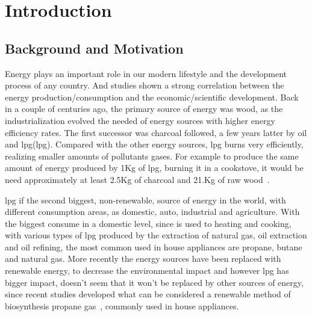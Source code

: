 \cleardoublepage
{}
\chapter{Introduction}
\section{Background and Motivation} %

Energy plays an important role in our modern lifestyle and the development process of any country. And studies shown a strong correlation between the energy production/consumption and the economic/scientific development. Back in a couple of centuries ago, the primary source of energy was wood, as the industrialization evolved the needed of energy sources with higher energy efficiency rates\cite{demirbasGlobalEnergySources2004}. The first successor was charcoal followed, a few years latter by oil and \acrshort{lpg}(\acrlong{lpg}). Compared with the other energy sources, \acrshort{lpg} burns very efficiently, realizing smaller amounts of pollutants gases. For example to produce the same amount of energy produced by 1Kg of \acrshort{lpg}, burning it in a cookstove, it would be need approximately at least 2.5Kg of charcoal and 21.Kg of raw wood~\cite{File201403Multiple}. 

\acrshort{lpg} if the second biggest, non-renewable, source of energy in the world, with different consumption areas, as domestic, auto, industrial and agriculture. With the biggest consume in a domestic level, since is used to heating and cooking, with various types of \acrshort{lpg} produced by the extraction of natural gas, oil extraction and oil refining, the most common used in house appliances are propane, butane and natural gas\cite{LiquefiedPetroleumGas}. More recently the energy sources have been replaced with renewable energy, to decrease the environmental impact and however \acrshort{lpg} has bigger impact, doesn't seem that it won't be replaced by other sources of energy, since recent studies developed what can be considered a renewable method of biosynthesis propane gas~\cite{kallioEngineeredPathwayBiosynthesis2014b}, commonly used in house appliances.   

